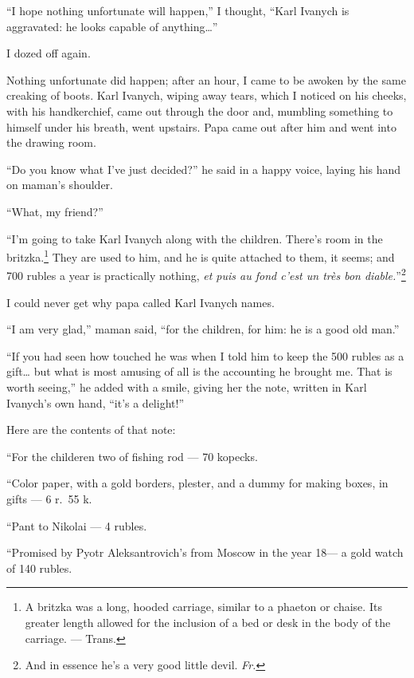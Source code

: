 ``I hope nothing unfortunate will happen,'' I thought, ``Karl Ivanych is aggravated: he looks capable of anything\ldots{}'' %

I dozed off again.

Nothing unfortunate did happen; after an hour, I came to be awoken by the same creaking of boots.  Karl Ivanych, wiping away tears, which I noticed on his cheeks, with his handkerchief, came out through the door and, mumbling something to himself under his breath, went upstairs. Papa came out after him and went into the drawing room.

``Do you know what I've just decided?'' he said in a happy voice, laying his hand on maman's shoulder. %

``What, my friend?'' %

``I'm going to take Karl Ivanych along with the children. There's room in the britzka.\footnote{A britzka was a long, hooded carriage, similar to a phaeton or chaise. Its greater length allowed for the inclusion of a bed or desk in the body of the carriage. --- Trans.} They are used to him, and he is quite attached to them, it seems; and 700 rubles a year is practically nothing, \textit{et puis au fond c'est un tr\`es bon diable.}''\footnote{And in essence he's a very good little devil. \textit{Fr.}} %

I could never get why papa called Karl Ivanych names.

``I am very glad,'' maman said, ``for the children, for him: he is a good old man.'' %

``If you had seen how touched he was when I told him to keep the 500 rubles as a gift\ldots{} but what is most amusing of all is the accounting he brought me. That is worth seeing,'' he added with a smile, giving her the note, written in Karl Ivanych's own hand, ``it's a delight!'' %

Here are the contents of that note:

``For the childeren two of fishing rod --- 70 kopecks.

``Color paper, with a gold borders, plester, and a dummy for making boxes, in gifts --- 6 r.~55 k.

``Pant to Nikolai --- 4 rubles.

``Promised by Pyotr Aleksantrovich's from Moscow in the year 18--- a gold watch of 140 rubles.


